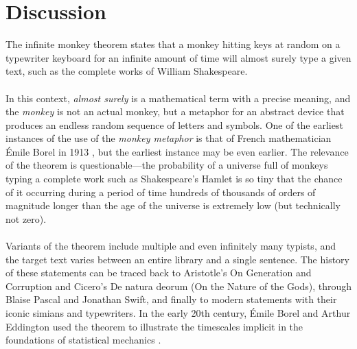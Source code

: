 \chapter{Discussion} \label{discussion}

The infinite monkey theorem states that a monkey hitting keys at random on a typewriter keyboard for an infinite amount of time will almost surely type a given text, such as the complete works of William Shakespeare.
\\
\\
In this context, \textit{almost surely} is a mathematical term with a precise meaning, and the \textit{monkey} is not an actual monkey, but a metaphor for an abstract device that produces an endless random sequence of letters and symbols. One of the earliest instances of the use of the \textit{monkey metaphor} is that of French mathematician Émile Borel in 1913 \cite{borel1913mecanique}, but the earliest instance may be even earlier. The relevance of the theorem is questionable—the probability of a universe full of monkeys typing a complete work such as Shakespeare's Hamlet is so tiny that the chance of it occurring during a period of time hundreds of thousands of orders of magnitude longer than the age of the universe is extremely low (but technically not zero).
\\
\\
Variants of the theorem include multiple and even infinitely many typists, and the target text varies between an entire library and a single sentence. The history of these statements can be traced back to Aristotle's On Generation and Corruption and Cicero's De natura deorum (On the Nature of the Gods), through Blaise Pascal and Jonathan Swift, and finally to modern statements with their iconic simians and typewriters. In the early 20th century, Émile Borel and Arthur Eddington used the theorem to illustrate the timescales implicit in the foundations of statistical mechanics \cite{wikiMonkeys}.

